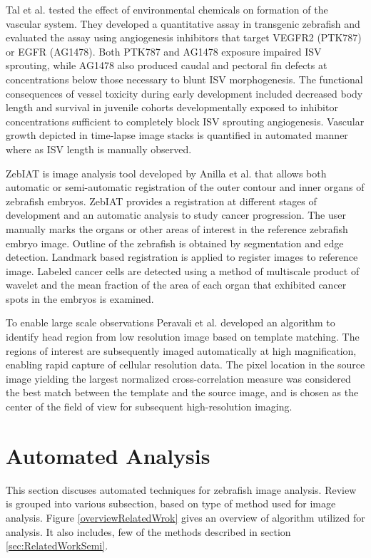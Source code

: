Tal et al. \cite{Tal14} tested the effect of environmental chemicals on formation of the vascular system. They developed a quantitative assay in transgenic zebrafish and evaluated the assay using angiogenesis inhibitors that target VEGFR2 (PTK787) or EGFR (AG1478). Both PTK787 and AG1478 exposure impaired ISV sprouting, while AG1478 also produced caudal and pectoral fin defects at concentrations below those necessary to blunt ISV morphogenesis. The functional consequences of vessel toxicity during early development included decreased body length and survival in juvenile cohorts developmentally exposed to inhibitor concentrations sufficient to completely block ISV sprouting angiogenesis. Vascular growth depicted in time-lapse image stacks is quantified in automated manner where as ISV length is manually observed. 

ZebIAT is image analysis tool developed by Anilla et al. \cite{annila2013} that allows both automatic or semi-automatic registration of the outer contour and inner organs of zebrafish embryos. ZebIAT provides a registration at different stages of development and an automatic analysis to study cancer progression. The user manually marks the organs or other areas of interest in the reference zebrafish embryo image. Outline of the zebrafish is obtained by segmentation and edge detection. Landmark based registration is applied to register images to reference image. Labeled cancer cells are detected using a method of multiscale product of wavelet and the mean fraction of the area of each organ that exhibited cancer spots in the embryos is examined.

To enable large scale observations Peravali et al. \cite{peravali2011} developed an algorithm to identify head region from low resolution image based on template matching. The regions of interest are subsequently imaged automatically at high magnification, enabling rapid capture of cellular resolution data. The pixel location in the source image yielding the largest normalized cross-correlation measure was considered the best match between the template and the source image, and is chosen as the center of the field of view for subsequent high-resolution imaging.

\section{Automated Analysis}
This section discuses automated techniques for zebrafish image analysis. Review is grouped into various subsection, based on type of method used for image analysis. Figure \ref{overviewRelatedWrok} gives an overview of algorithm utilized for analysis. It also includes, few of the methods described in section \ref{sec:RelatedWorkSemi}.

